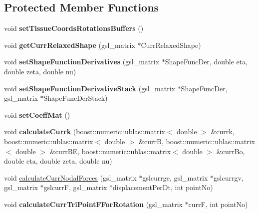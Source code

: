 \subsection*{Protected Member Functions}
\begin{DoxyCompactItemize}
\item 
\hypertarget{classPrism_a39d403ac6ffb6b56d5b2d07f8e9463a4}{}void {\bfseries set\+Tissue\+Coords\+Rotations\+Buffers} ()\label{classPrism_a39d403ac6ffb6b56d5b2d07f8e9463a4}

\item 
\hypertarget{classPrism_a3c252dc104a1ca7208b23c72737cd916}{}void {\bfseries get\+Curr\+Relaxed\+Shape} (gsl\+\_\+matrix $\ast$Curr\+Relaxed\+Shape)\label{classPrism_a3c252dc104a1ca7208b23c72737cd916}

\item 
\hypertarget{classPrism_aa1a4d3411d1f3dc05816ec01dcfa8310}{}void {\bfseries set\+Shape\+Function\+Derivatives} (gsl\+\_\+matrix $\ast$Shape\+Func\+Der, double eta, double zeta, double nu)\label{classPrism_aa1a4d3411d1f3dc05816ec01dcfa8310}

\item 
\hypertarget{classPrism_aa1f76f3cabdd00eb057f41cebbaa466d}{}void {\bfseries set\+Shape\+Function\+Derivative\+Stack} (gsl\+\_\+matrix $\ast$Shape\+Func\+Der, gsl\+\_\+matrix $\ast$Shape\+Func\+Der\+Stack)\label{classPrism_aa1f76f3cabdd00eb057f41cebbaa466d}

\item 
\hypertarget{classPrism_a0575442613f8b7d9428c58cef19ab219}{}void {\bfseries set\+Coeff\+Mat} ()\label{classPrism_a0575442613f8b7d9428c58cef19ab219}

\item 
\hypertarget{classPrism_aa433244f86cdf23a611a1adc3391c3f0}{}void {\bfseries calculate\+Currk} (boost\+::numeric\+::ublas\+::matrix$<$ double $>$ \&currk, boost\+::numeric\+::ublas\+::matrix$<$ double $>$ \&curr\+B, boost\+::numeric\+::ublas\+::matrix$<$ double $>$ \&curr\+B\+E, boost\+::numeric\+::ublas\+::matrix$<$ double $>$ \&curr\+Bo, double eta, double zeta, double nu)\label{classPrism_aa433244f86cdf23a611a1adc3391c3f0}

\item 
void \hyperlink{classPrism_a606fbf422f9d652e0f697ea93dc2e088}{calculate\+Curr\+Nodal\+Forces} (gsl\+\_\+matrix $\ast$gslcurrge, gsl\+\_\+matrix $\ast$gslcurrgv, gsl\+\_\+matrix $\ast$gslcurr\+F, gsl\+\_\+matrix $\ast$displacement\+Per\+Dt, int point\+No)
\item 
\hypertarget{classPrism_ae9403142a217a005a4d588a6e472be27}{}void {\bfseries calculate\+Curr\+Tri\+Point\+F\+For\+Rotation} (gsl\+\_\+matrix $\ast$curr\+F, int point\+No)\label{classPrism_ae9403142a217a005a4d588a6e472be27}


\end{DoxyCompactItemize}
